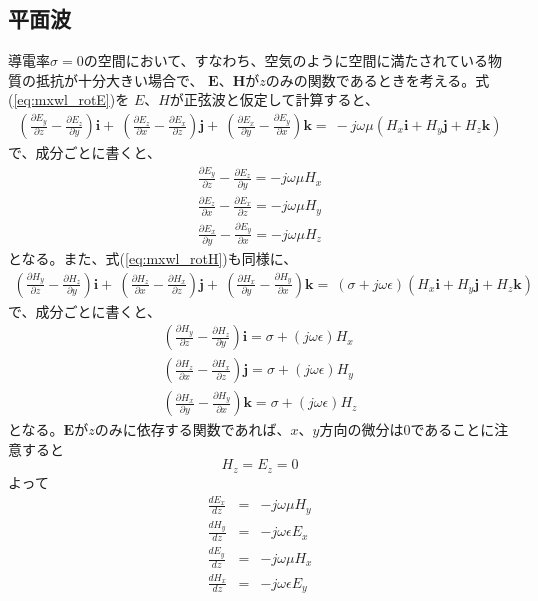 \subsection*{平面波}
導電率$\sigma=0$の空間において、すなわち、空気のように空間に満たされている物質の抵抗が十分大きい場合で、
$\bm{E}$、$\bm{H}$が$z$のみの関数であるときを考える。式(\ref{eq:mxwl_rotE})を
$E$、$H$が正弦波と仮定して計算すると、
\begin{eqnarray}
(\frac{\partial E_y}{\partial z} - \frac{\partial E_z}{\partial y})\bm{i} +\
(\frac{\partial E_z}{\partial x} - \frac{\partial E_x}{\partial z})\bm{j} +\
(\frac{\partial E_x}{\partial y} - \frac{\partial E_y}{\partial x})\bm{k} =\
-j\omega\mu(H_x\bm{i}+H_y\bm{j}+H_z\bm{k})
\end{eqnarray}
 で、成分ごとに書くと、
\begin{eqnarray}
\frac{\partial E_y}{\partial z} - \frac{\partial E_z}{\partial y} =- j\omega\mu H_x  \\
\frac{\partial E_z}{\partial x} - \frac{\partial E_x}{\partial z} =- j\omega\mu H_y  \label{eq:plane_waveEzExHy}\\
\frac{\partial E_x}{\partial y} - \frac{\partial E_y}{\partial x} = - j\omega\mu H_z  
\end{eqnarray}
となる。また、式(\ref{eq:mxwl_rotH})も同様に、
\begin{eqnarray}
(\frac{\partial H_y}{\partial z} - \frac{\partial H_z}{\partial y})\bm{i} +\
(\frac{\partial H_z}{\partial x} - \frac{\partial H_x}{\partial z})\bm{j} +\
(\frac{\partial H_x}{\partial y} - \frac{\partial H_y}{\partial x})\bm{k} =\
(\sigma + j\omega\epsilon)(H_x\bm{i}+H_y\bm{j}+H_z\bm{k})
\end{eqnarray}
で、成分ごとに書くと、
\begin{eqnarray}
(\frac{\partial H_y}{\partial z} - \frac{\partial H_z}{\partial y})\bm{i} = \sigma + (j\omega\epsilon)H_x\\
(\frac{\partial H_z}{\partial x} - \frac{\partial H_x}{\partial z})\bm{j} = \sigma + (j\omega\epsilon)H_y\\
(\frac{\partial H_x}{\partial y} - \frac{\partial H_y}{\partial x})\bm{k} = \sigma + (j\omega\epsilon)H_z
\end{eqnarray}
となる。$\bm{E}$が$z$のみに依存する関数であれば、$x$、$y$方向の微分は$0$であることに注意すると
\begin{equation}
H_z = E_z =0
\end{equation}
よって
\begin{eqnarray}
\frac{dE_x}{dz} &=& -j\omega\mu H_y \label{eq:plane_ExHy}\\
\frac{dH_y}{dz} &=& -j\omega\epsilon E_x \label{eq:plane_HyEx}\\
\frac{dE_y}{dz} &=& -j\omega\mu H_x \label{eq:plane_EyHx}\\
\frac{dH_x}{dz} &=& -j\omega\epsilon E_y \label{eq:plane_HxEy}
\end{eqnarray}
